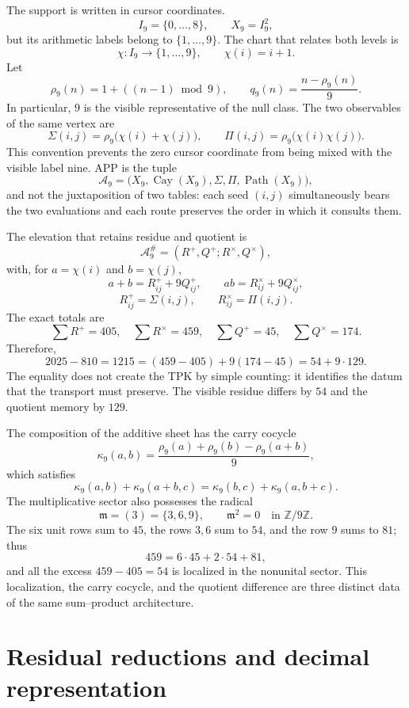 The support is written in cursor coordinates.
\[
 I_9=\{0,\ldots,8\},\qquad X_9=I_9^2,
\]
but its arithmetic labels belong to \(\{1,\ldots,9\}\). The chart
that relates both levels is
\[
 \chi:I_9\longrightarrow\{1,\ldots,9\},\qquad \chi(i)=i+1.
\]
Let
\[
 \rho_9(n)=1+((n-1)\bmod9),\qquad
 q_9(n)=\frac{n-\rho_9(n)}9.
\]
In particular, \(9\) is the visible representative of the null class. The two
observables of the same vertex are
\[
 \Sigma(i,j)=\rho_9\bigl(\chi(i)+\chi(j)\bigr),\qquad
 \Pi(i,j)=\rho_9\bigl(\chi(i)\chi(j)\bigr).
\]
This convention prevents the zero cursor coordinate from being mixed with the visible
label nine. APP is the tuple
\[
 \mathcal A_9=
 \bigl(X_9,\operatorname{Cay}(X_9),\Sigma,\Pi,
       \operatorname{Path}(X_9)\bigr),
\]
and not the juxtaposition of two tables: each seed \((i,j)\) simultaneously bears
the two evaluations and each route preserves the order in which it consults them.

The elevation that retains residue and quotient is
\[
 \mathcal A_9^\#=(R^+,Q^+;R^\times,Q^\times),
\]
with, for \(a=\chi(i)\) and \(b=\chi(j)\),
\[
 a+b=R^+_{ij}+9Q^+_{ij},\qquad
 ab=R^\times_{ij}+9Q^\times_{ij},
\]
\[
 R^+_{ij}=\Sigma(i,j),\qquad R^\times_{ij}=\Pi(i,j).
\]
The exact totals are
\[
 \sum R^+=405,\quad \sum R^\times=459,\quad
 \sum Q^+=45,\quad \sum Q^\times=174.
\]
Therefore,
\[
 2025-810=1215=(459-405)+9(174-45)=54+9\cdot129.
\]
The equality does not create the TPK by simple counting: it identifies the datum that the
transport must preserve. The visible residue differs by \(54\) and the quotient
memory by \(129\).

The composition of the additive sheet has the carry cocycle
\[
 \kappa_9(a,b)=
 \frac{\rho_9(a)+\rho_9(b)-\rho_9(a+b)}9,
\]
which satisfies
\[
 \kappa_9(a,b)+\kappa_9(a+b,c)
 =\kappa_9(b,c)+\kappa_9(a,b+c).
\]
The multiplicative sector also possesses the radical
\[
 \mathfrak m=(3)=\{3,6,9\},\qquad \mathfrak m^2=0
 \quad\text{in }\mathbb Z/9\mathbb Z.
\]
The six unit rows sum to \(45\), the rows \(3,6\) sum to \(54\), and
the row \(9\) sums to \(81\); thus
\[
 459=6\cdot45+2\cdot54+81,
\]
and all the excess \(459-405=54\) is localized in the nonunital sector. This
localization, the carry cocycle, and the quotient difference are three
distinct data of the same sum--product architecture.
\fi

\section{Residual reductions and decimal representation}

